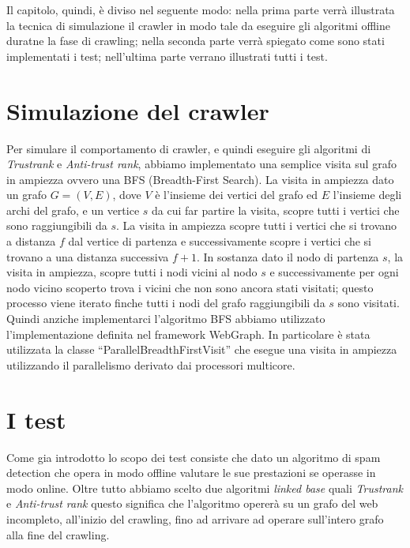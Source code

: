 Il capitolo, quindi, è diviso nel seguente modo: nella prima parte verrà illustrata la tecnica di simulazione il crawler in modo tale da eseguire gli algoritmi offline duratne la fase di crawling; nella seconda parte verrà spiegato come sono stati implementati i test; nell'ultima parte verrano illustrati tutti i test.

\section{Simulazione del crawler}
Per simulare il comportamento di crawler, e quindi eseguire gli algoritmi di \textit{Trustrank} e \textit{Anti-trust rank}, abbiamo implementato una semplice visita sul grafo in ampiezza ovvero una BFS \cite{bfsCormen} (Breadth-First Search). La visita in ampiezza dato un grafo \(G=(V,E)\), dove \(V\) è l'insieme dei vertici del grafo ed \(E\) l'insieme degli archi del grafo, e un vertice \(s\) da cui far partire la visita, scopre tutti i vertici che sono raggiungibili da \(s\). La visita in ampiezza scopre tutti i vertici che si trovano a distanza \(f\) dal vertice di partenza e successivamente scopre i vertici che si trovano a una distanza successiva \(f+1\). In sostanza dato il nodo di partenza \(s\), la visita in ampiezza, scopre tutti i nodi vicini al nodo \(s\) e successivamente per ogni nodo vicino scoperto trova i vicini che non sono ancora stati visitati; questo processo viene iterato finche tutti i nodi del grafo raggiungibili da \(s\) sono visitati. \\
Quindi anziche implementarci l'algoritmo BFS abbiamo utilizzato l'implementazione definita nel framework WebGraph. In particolare è stata utilizzata la classe ``ParallelBreadthFirstVisit'' che esegue una visita in ampiezza utilizzando il parallelismo derivato dai processori multicore.

\section{I test}
Come gia introdotto lo scopo dei test consiste che dato un algoritmo di spam detection che opera in modo offline valutare le sue prestazioni se operasse in modo online. Oltre tutto abbiamo scelto due algoritmi \textit{linked base} quali \textit{Trustrank} e \textit{Anti-trust rank} questo significa che l'algoritmo opererà su un grafo del web incompleto, all'inizio del crawling, fino ad arrivare ad operare sull'intero grafo alla fine del crawling.

